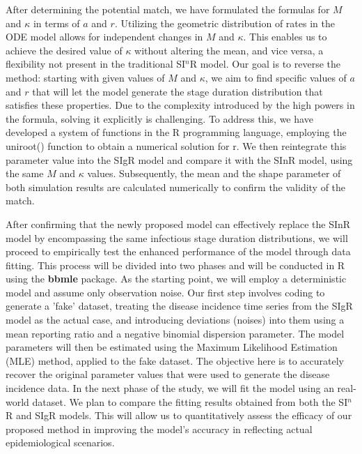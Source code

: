 \documentclass[12pt]{article}
\begin{document}
After determining the potential match, we have formulated the formulas for $M$ and $\kappa$ in terms of $a$ and $r$. Utilizing the geometric distribution of rates in the ODE model allows for independent changes in $M$ and $\kappa$. This enables us to achieve the desired value of $\kappa$ without altering the mean, and vice versa, a flexibility not present in the traditional SI$^n$R model. Our goal is to reverse the method: starting with given values of $M$ and $\kappa$, we aim to find specific values of $a$ and $r$ that will let the model generate the stage duration distribution that satisfies these properties. Due to the complexity introduced by the high powers in the formula, solving it explicitly is challenging. To address this, we have developed a system of functions in the R programming language, employing the uniroot() function to obtain a numerical solution for r. We then reintegrate this parameter value into the SIgR model and compare it with the SInR model, using the same $M$ and $\kappa$ values. Subsequently, the mean and the shape parameter of both simulation results are calculated numerically to confirm the validity of the match.

After confirming that the newly proposed model can effectively replace the SInR model by encompassing the same infectious stage duration distributions, we will proceed to empirically test the enhanced performance of the model through data fitting. This process will be divided into two phases and will be conducted in R using the \textbf{bbmle} package. As the starting point, we will employ a deterministic model and assume only observation noise. Our first step involves coding to generate a 'fake' dataset, treating the disease incidence time series from the SIgR model as the actual case, and introducing deviations (noises) into them using a mean reporting ratio and a negative binomial dispersion parameter. The model parameters will then be estimated using the Maximum Likelihood Estimation (MLE) method, applied to the fake dataset. The objective here is to accurately recover the original parameter values that were used to generate the disease incidence data. In the next phase of the study, we will fit the model using an real-world dataset. We plan to compare the fitting results obtained from both the SI$^n$R and SIgR models. This will allow us to quantitatively assess the efficacy of our proposed method in improving the model's accuracy in reflecting actual epidemiological scenarios.
\end{document}
